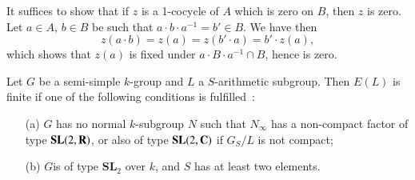 It suffices to show that if $z$ is a 1-cocycle of $A$ which is zero on $B$, then $z$ is zero. Let $a\in A$, $b\in B$ be such that $a\cdot b\cdot a^{-1}=b'\in B$. We have then
$$
z(a\cdot b)=z(a)=z(b'\cdot a)=b'\cdot z(a),
$$
which shows that $z(a)$ is fixed under $a\cdot B\cdot a^{-1}\cap B$, hence is zero.

\begin{theorem}\label{art04-thm3.6}
Let $G$ be a semi-simple $k$-group and $L$ a $S$-arithmetic subgroup. Then $E(L)$ is finite if one of the following conditions is fulfilled~:
\begin{itemize}
\item[{\rm(a)}] $G$ has no normal $k$-subgroup $N$ such that $N_{\infty}$ has a non-compact factor of type $\mathbf{SL}(2,\mathbf{R})$, or also of type $\mathbf{SL}(2,\mathbf{C})$ if $G_{S}/L$ is not compact;

\item[{\rm(b)}] $G$\pageoriginale is of type $\mathbf{SL}_{2}$ over $k$, and $S$ has at least two elements.
\end{itemize}
\end{theorem}

